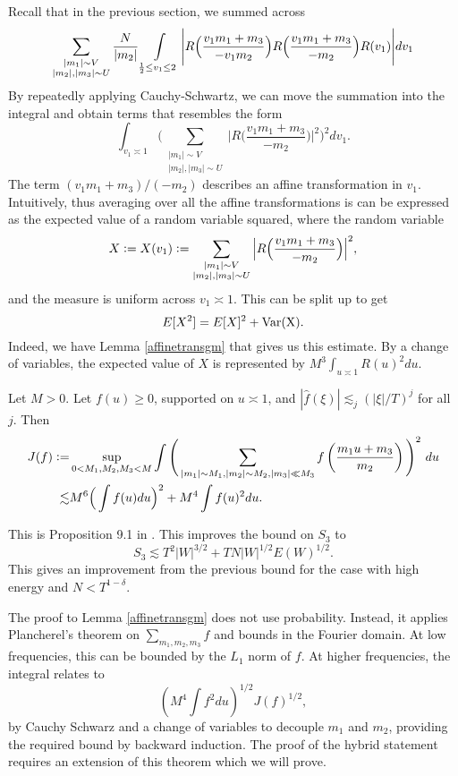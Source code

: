Recall that in the previous section, we summed across 
\[
    \sum_{\substack{|m_1|\sim V\\ |m_2|, |m_3|\sim U}} \frac{N}{|m_2|} \int\displaylimits_{\substack{
        \frac{1}{2}\leq v_1\leq 2
    }} \Bigg|R\Big(\frac{v_1m_1+m_3}{-v_1m_2}\Big) R\Big(\frac{v_1m_1+m_3}{-m_2}\Big) R({v_1})\Bigg| dv_1
\]
By repeatedly applying Cauchy-Schwartz, we can move the summation into the integral and obtain terms that resembles the form \[
   \int_{v_1\asymp 1} \Bigg(\sum_{\substack{|m_1|\sim V\\ |m_2|, |m_3|\sim U}}  \Big| R\Big(\frac{v_1m_1+m_3}{-m_2}\Big)\Big|^2\Bigg)^2 dv_1.
\]
The term $(v_1m_1+m_3)/(-m_2)$ describes an affine transformation in $v_1$. Intuitively, thus averaging over all the affine transformations is can be expressed as the expected value of a random variable squared, where the random variable \[
X\mathrel{\mathop:}= X(v_1)\mathrel{\mathop:}= \sum_{\substack{|m_1|\sim V\\ |m_2|, |m_3|\sim U}}  \Big| R\Big(\frac{v_1m_1+m_3}{-m_2}\Big)\Big|^2,
\] and the measure is uniform across $v_1\asymp 1$. This can be split up to get \[
E[X^2] = E[X]^2 + \rm{Var}(X).
\] Indeed, we have Lemma \ref{affinetransgm} that gives us this estimate. 
By a change of variables, the expected value of $X$ is represented by $M^3 \int_{u\asymp 1} R(u)^2 du$.
\begin{lemma}\label{affinetransgm}
    Let $M>0$. Let $f(u)\geq 0$, supported on $u\asymp 1$, and $|\hat{f}(\xi)|\lesssim_j (|\xi|/T)^j$ for all $j$. Then \begin{align*}
        J(f)\mathrel{\mathop:}= &\sup_{0<M_1,M_2,M_3<M} \int\Bigg( \sum_{\substack{|m_1|\sim M_1,|m_2|\sim M_2 , |m_3|\ll M_3}} f\left(\frac{m_1 u+m_3}{m_2}\right)\Bigg)^2 \ du\\
        \lesssim&M^6\Big( \int f(u) du\Big)^2+M^4 \int f(u)^2 du.
    \end{align*}
\end{lemma}
This is Proposition 9.1 in \cite{GM2024}.
This improves the bound on $S_3$ to\[
S_3\lesssim T^2|W|^{3/2}+TN|W|^{1/2}E(W)^{1/2}.
\]
This gives an improvement from the previous bound for the case with high energy and $N<T^{1-\delta}$.
\begin{remark}
    The proof to Lemma \ref{affinetransgm} does not use probability. Instead, it applies Plancherel's theorem on $\sum_{m_1,m_2,m_3} f$ and bounds in the Fourier domain.
    At low frequencies, this can be bounded by the $L_1$ norm of $f$. At higher frequencies, the integral relates to \[
     (M^4\int f^2 du)^{1/2}J(f)^{1/2},
    \]
    by Cauchy Schwarz and a change of variables to decouple $m_1$ and $m_2$, providing the required bound by backward induction. The proof of the hybrid statement requires an extension of this theorem
    which we will prove.
\end{remark}

